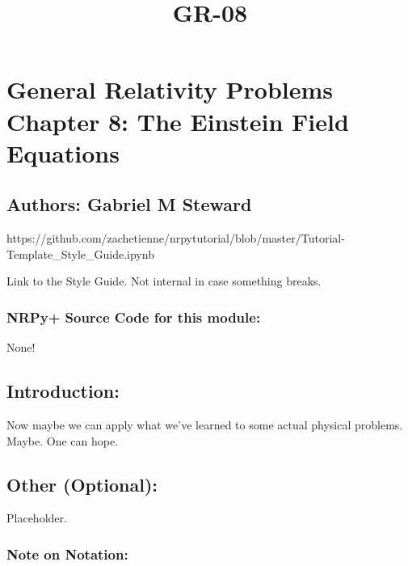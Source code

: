 \documentclass[landscape,letterpaper,10pt,english]{article}
\title{GR-08}
\begin{document}
    
    \maketitle
    
    

    
    \hypertarget{general-relativity-problems-chapter-8-the-einstein-field-equations}{%
\section{General Relativity Problems Chapter 8: The Einstein Field
Equations}\label{general-relativity-problems-chapter-8-the-einstein-field-equations}}

\hypertarget{authors-gabriel-m-steward}{%
\subsection{Authors: Gabriel M
Steward}\label{authors-gabriel-m-steward}}

    https://github.com/zachetienne/nrpytutorial/blob/master/Tutorial-Template\_Style\_Guide.ipynb

Link to the Style Guide. Not internal in case something breaks.

    \hypertarget{nrpy-source-code-for-this-module}{%
\subsubsection{\texorpdfstring{ NRPy+ Source Code for this
module:}{ NRPy+ Source Code for this module:}}\label{nrpy-source-code-for-this-module}}

None!

\hypertarget{introduction}{%
\subsection{Introduction:}\label{introduction}}

Now maybe we can apply what we've learned to some actual physical
problems. Maybe. One can hope.

\hypertarget{other-optional}{%
\subsection{\texorpdfstring{ Other
(Optional):}{ Other (Optional):}}\label{other-optional}}

Placeholder.

\hypertarget{note-on-notation}{%
\subsubsection{Note on Notation:}\label{note-on-notation}}
\end{document}
